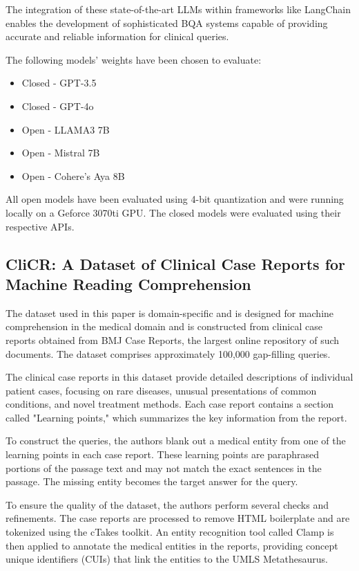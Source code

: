 \documentclass[onecolumn, conference]{IEEEtran}
\begin{document}
The integration of these state-of-the-art LLMs within frameworks like LangChain enables the development of sophisticated BQA systems capable of providing accurate and reliable information for clinical queries.

The following models' weights have been chosen to evaluate:
\begin{itemize}
  \item Closed -  GPT-3.5
  \item Closed -  GPT-4o
  \item Open -    LLAMA3 7B
  \item Open -    Mistral 7B
  \item Open -    Cohere's Aya 8B
\end{itemize}

All open models have been evaluated using 4-bit quantization and were running locally on a Geforce 3070ti GPU. The closed models were evaluated using their respective APIs.

\subsection{CliCR: A Dataset of Clinical Case Reports for Machine Reading Comprehension \cite{Suster2018}}
The dataset used in this paper is domain-specific \cite{Wang2022} and is designed for machine comprehension in the medical domain and is constructed from clinical case reports obtained from BMJ Case Reports, the largest online repository of such documents. The dataset comprises approximately 100,000 gap-filling queries.

The clinical case reports in this dataset provide detailed descriptions of individual patient cases, focusing on rare diseases, unusual presentations of common conditions, and novel treatment methods. Each case report contains a section called "Learning points," which summarizes the key information from the report.

To construct the queries, the authors blank out a medical entity from one of the learning points in each case report. These learning points are paraphrased portions of the passage text and may not match the exact sentences in the passage. The missing entity becomes the target answer for the query.

To ensure the quality of the dataset, the authors perform several checks and refinements. The case reports are processed to remove HTML boilerplate and are tokenized using the cTakes toolkit. An entity recognition tool called Clamp is then applied to annotate the medical entities in the reports, providing concept unique identifiers (CUIs) that link the entities to the UMLS Metathesaurus.
\end{document}

